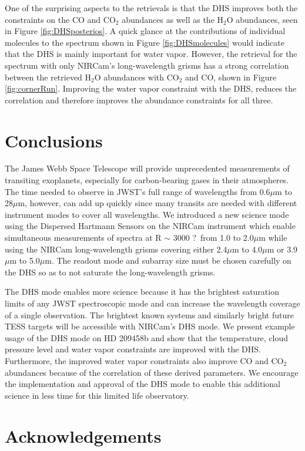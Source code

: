 \documentclass[iop]{emulateapj}
\newcommand{\DHSres}{3000 ?}
\begin{document}
One of the surprising aspects to the retrievals is that the DHS improves both the constraints on the CO and CO$_2$ abundances as well as the H$_2$O abundances, seen in Figure \ref{fig:DHSposterios}.
A quick glance at the contributions of individual molecules to the spectrum shown in Figure \ref{fig:DHSmolecules} would indicate that the DHS is mainly important for water vapor.
However, the retrieval for the spectrum with only NIRCam's long-wavelength grisms has a strong correlation between the retrieved H$_2$O abundances with CO$_2$ and CO, shown in Figure \ref{fig:cornerRun}.
Improving the water vapor constraint with the DHS, reduces the correlation and therefore improves the abundance constraints for all three.

\section{Conclusions}

The James Webb Space Telescope will provide unprecedented measurements of transiting exoplanets, especially for carbon-bearing gases in their atmospheres.
The time needed to observe in JWST's full range of wavelengths from 0.6$\mu$m to 28$\mu$m, however, can add up quickly since many transits are needed with different instrument modes to cover all wavelengths.
We introduced a new science mode using the Dispersed Hartmann Sensors on the NIRCam instrument which enable simultaneous measurements of spectra at R $\sim$ \DHSres\ from 1.0 to 2.0$\mu$m while using the NIRCam long-wavelength grisms covering either 2.4$\mu$m to 4.0$\mu$m or 3.9$\mu$m to 5.0$\mu$m.
The readout mode and subarray size must be chosen carefully on the DHS so as to not saturate the long-wavelength grisms.

The DHS mode enables more science because it has the brightest saturation limits of any JWST spectroscopic mode and can increase the wavelength coverage of a single observation.
The brightest known systems and similarly bright future TESS targets will be accessible with NIRCam's DHS mode.
We present example usage of the DHS mode on HD 209458b and show that the temperature, cloud pressure level and water vapor constraints are improved with the DHS.
Furthermore, the improved water vapor constraints also improve CO and CO$_2$ abundances because of the correlation of these derived parameters.
We encourage the implementation and approval of the DHS mode to enable this additional science in less time for this limited life observatory.

\section{Acknowledgements}
\end{document}
